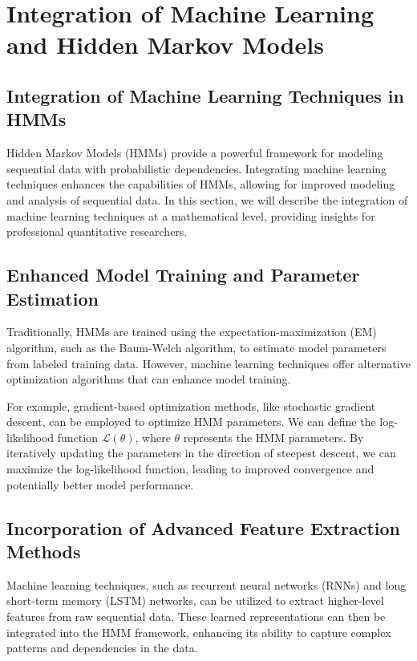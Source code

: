 \documentclass[a4paper,11pt]{article}
\begin{document}
\section{Integration of Machine Learning and Hidden Markov Models}
\label{sec:ML-and-HHM}

\subsection*{Integration of Machine Learning Techniques in HMMs}

Hidden Markov Models (HMMs) provide a powerful framework for modeling sequential data with probabilistic dependencies. Integrating machine learning techniques enhances the capabilities of HMMs, allowing for improved modeling and analysis of sequential data. In this section, we will describe the integration of machine learning techniques at a mathematical level, providing insights for professional quantitative researchers.

\subsection*{Enhanced Model Training and Parameter Estimation}

Traditionally, HMMs are trained using the expectation-maximization (EM) algorithm, such as the Baum-Welch algorithm, to estimate model parameters from labeled training data. However, machine learning techniques offer alternative optimization algorithms that can enhance model training.

For example, gradient-based optimization methods, like stochastic gradient descent, can be employed to optimize HMM parameters. We can define the log-likelihood function $\mathcal{L}(\theta)$, where $\theta$ represents the HMM parameters. By iteratively updating the parameters in the direction of steepest descent, we can maximize the log-likelihood function, leading to improved convergence and potentially better model performance.

\subsection*{Incorporation of Advanced Feature Extraction Methods}

Machine learning techniques, such as recurrent neural networks (RNNs) and long short-term memory (LSTM) networks, can be utilized to extract higher-level features from raw sequential data. These learned representations can then be integrated into the HMM framework, enhancing its ability to capture complex patterns and dependencies in the data.
\end{document}
